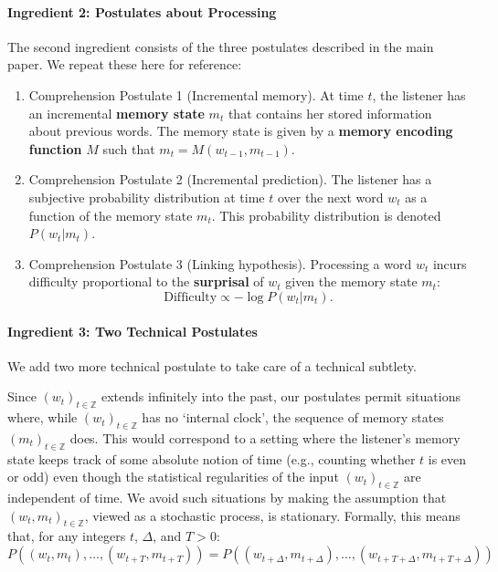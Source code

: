 \documentclass[11pt,letterpaper]{article}
\newcommand{\key}[1]{\textbf{#1}}
\begin{document}
\paragraph{Ingredient 2: Postulates about Processing}
The second ingredient consists of the three postulates described in the main paper.
We repeat these here for reference:
\begin{enumerate}
    \item Comprehension Postulate 1 (Incremental memory). At time $t$, the listener has an incremental \key{memory state} $m_t$ that contains her stored information about previous words. The memory state is given by a \key{memory encoding function} $M$ such that $m_t = M(w_{t-1}, m_{t-1})$.
    \item Comprehension Postulate 2 (Incremental prediction). The listener has a subjective probability distribution at time $t$ over the next word $w_t$ as a function of the memory state $m_t$. This probability distribution is denoted $P(w_t|m_t)$.
    \item Comprehension Postulate 3 (Linking hypothesis). Processing a word $w_t$ incurs difficulty proportional to the \key{surprisal} of $w_t$ given the memory state $m_t$:
    \begin{equation}
    \label{eq:lossy-surp}
    \text{Difficulty} \propto -\log P(w_t | m_t).
\end{equation}
\end{enumerate}

\paragraph{Ingredient 3: Two Technical Postulates}

We add two more technical postulate to take care of a technical subtlety.

Since $(w_t)_{t \in \mathbb{Z}}$ extends infinitely into the past, our postulates permit situations where, while $(w_t)_{t \in \mathbb{Z}}$ has no `internal clock', the sequence of memory states $(m_t)_{t \in \mathbb{Z}}$ does.
This would correspond to a setting where the listener's memory state keeps track of some absolute notion of time (e.g., counting whether $t$ is even or odd) even though the statistical regularities of the input $(w_t)_{t \in \mathbb{Z}}$ are independent of time.
We avoid such situations by making the assumption that $(w_t, m_t)_{t \in \mathbb{Z}}$, viewed as a stochastic process, is stationary.
Formally, this means that, for any integers $t$, $\Delta$, and $T>0$:
\begin{equation}
	P((w_t, m_t), \dots, (w_{t+T}, m_{t+T})) = 	P((w_{t+\Delta}, m_{t+\Delta}), \dots, (w_{t+T+\Delta}, m_{t+T+\Delta}))
\end{equation}
\end{document}
